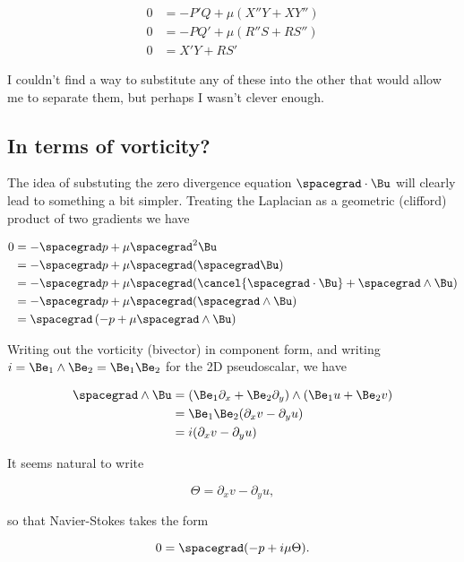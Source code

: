 \begin{align}\label{eqn:nsVorticity:70}
0 &= -P' Q + \mu (X'' Y + X Y'') \\
0 &= -P Q' + \mu (R'' S + R S'') \\
0 &= X' Y + R S'
\end{align}

I couldn't find a way to substitute any of these into the other that would allow me to separate them, but perhaps I wasn't clever enough.  

\subsection{In terms of vorticity?}

The idea of substuting the zero divergence equation $\spacegrad \cdot \Bu$ will clearly lead to something a bit simpler.  Treating the Laplacian as a geometric (clifford) product of two gradients we have

\begin{align*}
0 
&= -\spacegrad p + \mu \spacegrad^2 \Bu \\
&= -\spacegrad p + \mu \spacegrad ( \spacegrad \Bu ) \\
&= -\spacegrad p + \mu \spacegrad ( \cancel{\spacegrad \cdot \Bu} + \spacegrad \wedge \Bu ) \\
&= -\spacegrad p + \mu \spacegrad ( \spacegrad \wedge \Bu ) \\
&= \spacegrad \left( -p + \mu \spacegrad \wedge \Bu \right)
\end{align*}

Writing out the vorticity (bivector) in component form, and writing $i = \Be_1 \wedge \Be_2 = \Be_1 \Be_2$ for the 2D pseudoscalar, we have

\begin{align*}
\spacegrad \wedge \Bu 
&= (\Be_1 \partial_x + \Be_2 \partial_y) \wedge (\Be_1 u + \Be_2 v) \\
&= \Be_1 \Be_2 (\partial_x v - \partial_y u ) \\
&= i (\partial_x v - \partial_y u )
\end{align*}

It seems natural to write

\begin{equation}\label{eqn:qmTwoExamReflection:90}
\Theta = \partial_x v - \partial_y u,
\end{equation}

so that Navier-Stokes takes the form

\begin{equation}\label{eqn:qmTwoExamReflection:110}
0 = \spacegrad (-p + i \mu \Theta ).
\end{equation}

